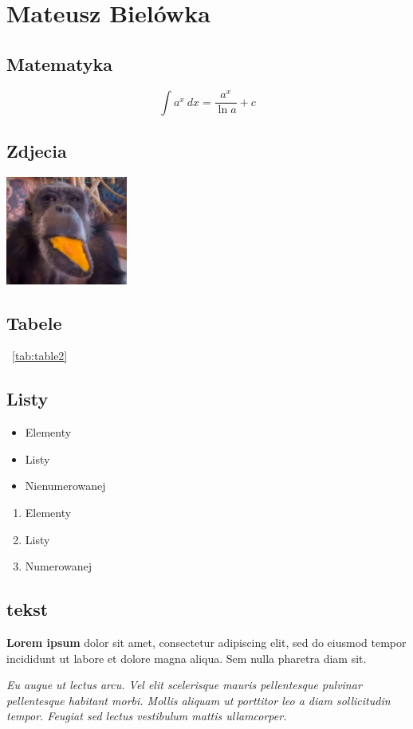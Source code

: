 \section{Mateusz Bielówka}

\subsection{Matematyka}
\[ \int a^x\ dx = \frac{a^x}{\ln a} +c\]

\subsection{Zdjecia}
\includegraphics[width=0.3\textwidth]{pictures/monke.png}

\subsection{Tabele}

~\ref{tab:table2}

 
\subsection{Listy}

\begin{itemize}
  \item Elementy
  \item Listy
  \item Nienumerowanej
\end{itemize}

\begin{enumerate}
  \item Elementy
  \item Listy
  \item Numerowanej
\end{enumerate}

\subsection{tekst}
\textbf{Lorem ipsum} dolor sit amet, consectetur adipiscing elit, sed do eiusmod tempor incididunt ut labore et dolore magna aliqua. Sem nulla pharetra diam sit. \par

\textit{Eu augue ut lectus arcu. Vel elit scelerisque mauris pellentesque pulvinar pellentesque habitant morbi. Mollis aliquam ut porttitor leo a diam sollicitudin tempor. Feugiat sed lectus vestibulum mattis ullamcorper. }